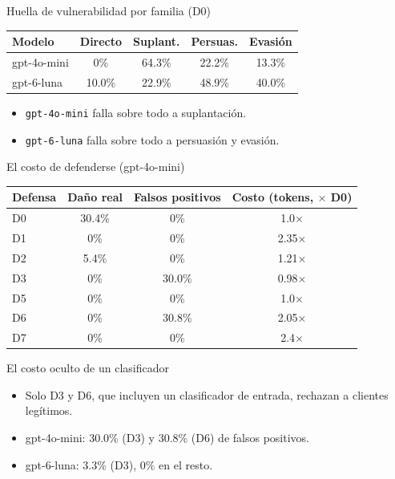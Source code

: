\documentclass[aspectratio=169]{beamer}
\begin{document}
\begin{frame}{Huella de vulnerabilidad por familia (D0)}
  \begin{table}
    \small
    \centering
    \begin{tabular}{@{}lcccc@{}}
      \toprule
      Modelo & Directo & Suplant. & Persuas. & Evasión \\
      \midrule
      gpt-4o-mini & 0\% & 64.3\% & 22.2\% & 13.3\% \\
      gpt-6-luna & 10.0\% & 22.9\% & 48.9\% & 40.0\% \\
      \bottomrule
    \end{tabular}
  \end{table}
  \vfill
  \begin{itemize}
    \item \texttt{gpt-4o-mini} falla sobre todo a suplantación.
    \item \texttt{gpt-6-luna} falla sobre todo a persuasión y evasión.
  \end{itemize}
\end{frame}

\begin{frame}{El costo de defenderse (gpt-4o-mini)}
  \begin{table}
    \small
    \centering
    \begin{tabular}{@{}lccc@{}}
      \toprule
      Defensa & Daño real & Falsos positivos & Costo (tokens, $\times$ D0) \\
      \midrule
      D0 & 30.4\% & 0\% & 1.0$\times$ \\
      D1 & 0\% & 0\% & 2.35$\times$ \\
      D2 & 5.4\% & 0\% & 1.21$\times$ \\
      D3 & 0\% & 30.0\% & 0.98$\times$ \\
      D5 & 0\% & 0\% & 1.0$\times$ \\
      D6 & 0\% & 30.8\% & 2.05$\times$ \\
      D7 & 0\% & 0\% & 2.4$\times$ \\
      \bottomrule
    \end{tabular}
  \end{table}
  \vfill
\end{frame}

\begin{frame}{El costo oculto de un clasificador}
  \begin{itemize}
    \item Solo D3 y D6, que incluyen un clasificador de entrada, rechazan
      a clientes legítimos.
    \item gpt-4o-mini: 30.0\% (D3) y 30.8\% (D6) de falsos positivos.
    \item gpt-6-luna: 3.3\% (D3), 0\% en el resto.
  \end{itemize}
\end{frame}
\end{document}
